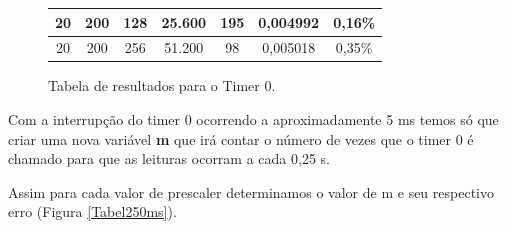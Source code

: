 \documentclass{article}
\begin{document}
\begin{figure}[H]
\begin{tabular}{|c|c|c|c|c|c|c|}
\rowcolor[HTML]{FFFFFF} 
20                                                          & 200                                                                & 128                 & 25.600                                                    & 195          & 0,004992                                               & 0,16\%        \\ \hline
\rowcolor[HTML]{FFFFFF} 
20                                                          & 200                                                                & 256                 & 51.200                                                    & 98           & 0,005018                                               & 0,35\%        \\ \hline
\end{tabular}

\caption{Tabela de resultados para o Timer 0.}
\label{Tabel5ms}

\end{figure}

Com a interrupção do timer 0 ocorrendo a aproximadamente 5 ms temos só que criar uma nova variável \textbf{m} que irá contar o número de vezes que o timer 0 é chamado para que as leituras ocorram a cada 0,25 s.\par

Assim para cada valor de prescaler determinamos o valor de m e seu respectivo erro (Figura \ref{Tabel250ms}).


\end{document}
